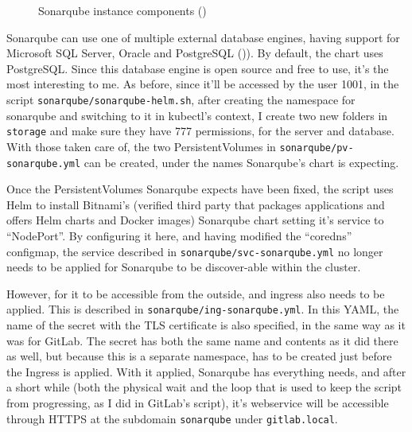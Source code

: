 \documentclass[11pt]{article}
\begin{document}
\begin{flushleft}
    \begin{figure}[htb]
		\centering
		\caption{Sonarqube instance components (\cite{sonarqubeinstall})}
	\end{figure}

    Sonarqube can use one of multiple external database engines, having support for Microsoft SQL Server, Oracle and PostgreSQL (\cite{sonarqubeinstall})). By default, the chart uses PostgreSQL. Since this database engine is open source and free to use, it's the most interesting to me. As before, since it'll be accessed by the user 1001, in the script \texttt{sonarqube/sonarqube-helm.sh}, after creating the namespace for sonarqube and switching to it in kubectl's context, I create two new folders in \texttt{storage} and make sure they have 777 permissions, for the server and database. With those taken care of, the two PersistentVolumes in \texttt{sonarqube/pv-sonarqube.yml} can be created, under the names Sonarqube's chart is expecting.
    \linebreak

    Once the PersistentVolumes Sonarqube expects have been fixed, the script uses Helm to install Bitnami's (verified third party that packages applications and offers Helm charts and Docker images) Sonarqube chart setting it's service to ``NodePort''. By configuring it here, and having modified the ``coredns'' configmap, the service described in \texttt{sonarqube/svc-sonarqube.yml} no longer needs to be applied for Sonarqube to be discover-able within the cluster.
    \linebreak

    However, for it to be accessible from the outside, and ingress also needs to be applied. This is described in \texttt{sonarqube/ing-sonarqube.yml}. In this YAML, the name of the secret with the TLS certificate is also specified, in the same way as it was for GitLab. The secret has both the same name and contents as it did there as well, but because this is a separate namespace, has to be created just before the Ingress is applied. With it applied, Sonarqube has everything needs, and after a short while (both the physical wait and the loop that is used to keep the script from progressing, as I did in GitLab's script), it's webservice will be accessible through HTTPS at the subdomain \texttt{sonarqube} under \texttt{gitlab.local}. 
    \linebreak


\end{flushleft}
\end{document}
